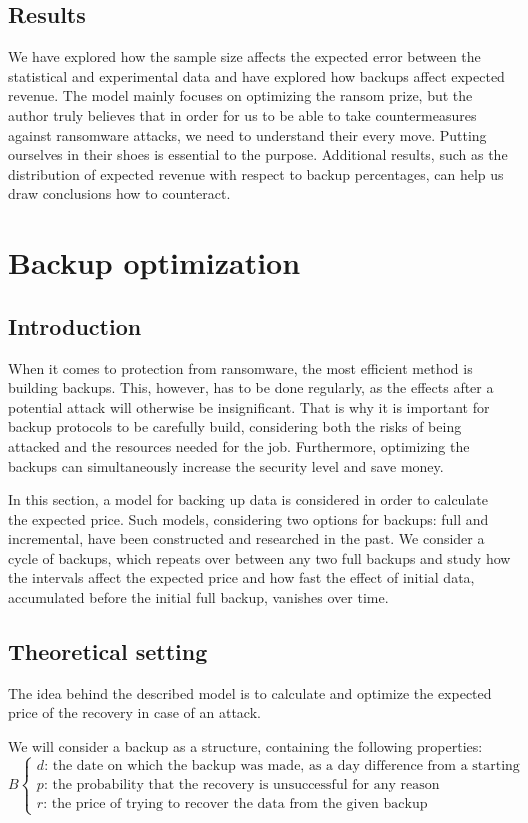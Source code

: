 \documentclass[11pt, a4paper]{article}
\theoremstyle{definition}
\begin{document}
		\subsection{Results}
		We have explored how the sample size affects the expected error between the statistical and experimental data and have explored how backups affect expected revenue. The model mainly focuses on optimizing the ransom prize, but the author truly believes that in order for us to be able to take countermeasures against ransomware attacks, we need to understand their every move. Putting ourselves in their shoes is essential to the purpose. Additional results, such as the distribution of expected revenue with respect to backup percentages, can help us draw conclusions how to counteract.
\section{Backup optimization}
	\subsection{Introduction}
		When it comes to protection from ransomware, the most efficient method is building backups. This, however, has to be done regularly, as the effects after a potential attack will otherwise be insignificant. That is why it is important for backup protocols to be carefully build, considering both the risks of being attacked and the resources needed for the job. Furthermore, optimizing the backups can simultaneously increase the security level and save money.\par
		In this section, a model for backing up data is considered in order to calculate the expected price. Such models, considering two options for backups: full and incremental, have been constructed and researched in the past\cite{nakamura2003optimal}\cite{qian2010optimal}. We consider a cycle of backups, which repeats over between any two full backups and study how the intervals affect the expected price and how fast the effect of initial data, accumulated before the initial full backup, vanishes over time.
	\subsection{Theoretical setting}
		The idea behind the described model is to calculate and optimize the expected price of the recovery in case of an attack.\par
		We will consider a backup as a structure, containing the following properties:
		$$
		B
		\begin{cases}
			d \text{: the date on which the backup was made, as a day difference from a starting point}\\
			p \text{: the probability that the recovery is unsuccessful for any reason}\\
			r \text{: the price of trying to recover the data from the given backup}
		\end{cases}
		$$
		
\end{document}
